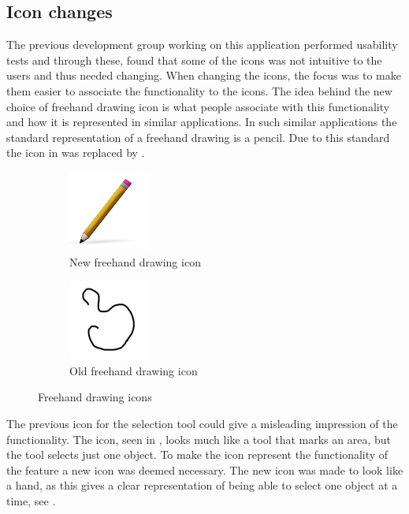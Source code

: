 \subsection{Icon changes}
The previous development group working on this application \citep{misc:crocold} performed usability tests and through these, found that some of the icons was not intuitive to the users and thus needed changing.
When changing the icons, the focus was to make them easier to associate the functionality to the icons.
The idea behind the new choice of freehand drawing icon is what people associate with this functionality and how it is represented in similar applications.
In such similar applications the standard representation of a freehand drawing is a pencil.
Due to this standard the icon in  was replaced by .

\begin{figure}[h]
	\centering
	\begin{subfigure}[b]{0.45\textwidth}
		\centering
		\includegraphics[scale = 1]{media/freehandNew}
		\caption{New freehand drawing icon}
		\label{figure:new-freehand}
	\end{subfigure}
	\qquad
	\begin{subfigure}[b]{0.45\textwidth}
		\centering
		\includegraphics[scale = 0.1]{media/freehandOld}
		\caption{Old freehand drawing icon}
		\label{figure:old-freehand}
	\end{subfigure}
	\caption{Freehand drawing icons}
	\label{figure:freehand}
\end{figure}

The previous icon for the selection tool could give a misleading impression of the functionality.
The icon, seen in , looks much like a tool that marks an area, but the tool selects just one object.
To make the icon represent the functionality of the feature a new icon was deemed necessary.
The new icon was made to look like a hand, as this gives a clear representation of being able to select one object at a time, see .

